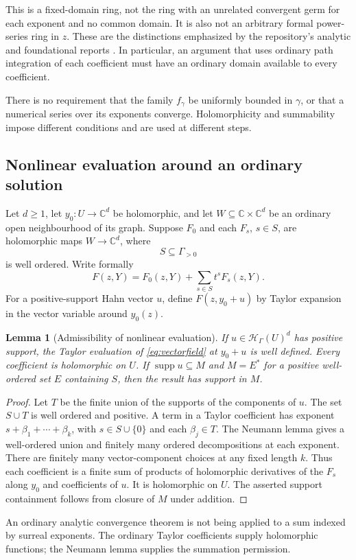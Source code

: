 \documentclass[11pt,letterpaper]{article}
\numberwithin{equation}{section}
\newtheorem{lemma}[theorem]{Lemma}
\theoremstyle{definition}
\theoremstyle{remark}
\newcommand{\C}{\mathbb C}
\newcommand{\HH}{\mathcal H}
\newcommand{\supp}{\operatorname{supp}}
\begin{document}
This is a fixed-domain ring, not the ring with an unrelated convergent germ for each exponent and no common domain. It is also not an arbitrary formal power-series ring in $z$. These are the distinctions emphasized by the repository's analytic and foundational reports \cite{RepoAnalysis,RepoFound}. In particular, an argument that uses ordinary path integration of each coefficient must have an ordinary domain available to every coefficient.

There is no requirement that the family $f_\gamma$ be uniformly bounded in $\gamma$, or that a numerical series over its exponents converge. Holomorphicity and summability impose different conditions and are used at different steps.

\subsection{Nonlinear evaluation around an ordinary solution}
Let $d\ge1$, let $y_0:U\to\C^d$ be holomorphic, and let $W\subseteq\C\times\C^d$ be an ordinary open neighbourhood of its graph. Suppose $F_0$ and each $F_s$, $s\in S$, are holomorphic maps $W\to\C^d$, where
\[
 S\subseteq\Gamma_{>0}
\]
is well ordered. Write formally
\begin{equation}\label{eq:vectorfield}
 F(z,Y)=F_0(z,Y)+\sum_{s\in S}t^sF_s(z,Y).
\end{equation}
For a positive-support Hahn vector $u$, define $F(z,y_0+u)$ by Taylor expansion in the vector variable around $y_0(z)$.

\begin{lemma}[Admissibility of nonlinear evaluation]\label{lem:nonlinear}
If $u\in\HH_\Gamma(U)^d$ has positive support, the Taylor evaluation of \eqref{eq:vectorfield} at $y_0+u$ is well defined. Every coefficient is holomorphic on $U$. If $\supp u\subseteq M$ and $M=E^*$ for a positive well-ordered set $E$ containing $S$, then the result has support in $M$.
\end{lemma}
\begin{proof}
Let $T$ be the finite union of the supports of the components of $u$. The set $S\cup T$ is well ordered and positive. A term in a Taylor coefficient has exponent $s+\beta_1+\cdots+\beta_k$, with $s\in S\cup\{0\}$ and each $\beta_j\in T$. The Neumann lemma gives a well-ordered union and finitely many ordered decompositions at each exponent. There are finitely many vector-component choices at any fixed length $k$. Thus each coefficient is a finite sum of products of holomorphic derivatives of the $F_s$ along $y_0$ and coefficients of $u$. It is holomorphic on $U$. The asserted support containment follows from closure of $M$ under addition.
\end{proof}
An ordinary analytic convergence theorem is not being applied to a sum indexed by surreal exponents. The ordinary Taylor coefficients supply holomorphic functions; the Neumann lemma supplies the summation permission.
\end{document}
